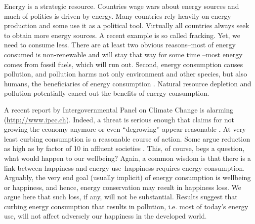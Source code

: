 \documentclass[10pt, letterpaper]{article}
\begin{document}
\begin{spacing}{1.5}

 Energy is a strategic
resource. Countries wage wars about energy sources  and much of politics is
driven by energy. %
Many  countries rely heavily on energy production
and some use it as a political tool. %
%
 Virtually all countries  always seek to obtain more energy sources. A recent example is so called
fracking. Yet, we need to consume less. There are at least two
obvious reasons--most of energy consumed  is non-renewable and will stay
that way for some time \citep{mackay08}--most energy comes from
fossil fuels, which will run out. %
Second, energy consumption causes pollution, and pollution harms not only
 environment and other species, but also  humans, the beneficiaries of energy
consumption \citep{mackerron09,gandelman12,ferreira13}. Natural resource
depletion and pollution potentially cancel out the benefits of energy
consumption. 
 
A recent report by
Intergovernmental Panel on Climate Change is alarming 
(\url{http://www.ipcc.ch}). %
Indeed, a threat is serious enough that
claims for not growing the economy anymore or even ``degrowing'' 
appear reasonable \citep{kallis11, kallis12}. %
At very
least curbing consumption is a reasonable course of action. Some argue reduction as high
as by factor of 10 in affluent societies \citep{pretty13}. This,
of course, begs a question, what would happen to our wellbeing?
 Again, a common %
wisdom is that there is a link between happiness and
energy use--happiness requires energy consumption.
Arguably, the very end goal (usually implicit)
of energy consumption is wellbeing or happiness, and hence,  %
%
 energy conservation may result in happiness loss.
 We argue here that such loss, if
any,  will
not be substantial. Results suggest that curbing energy consumption that results
in pollution, i.e. most of today's energy use, will not affect adversely our
happiness in the developed world.  %



\end{spacing}
\end{document}
